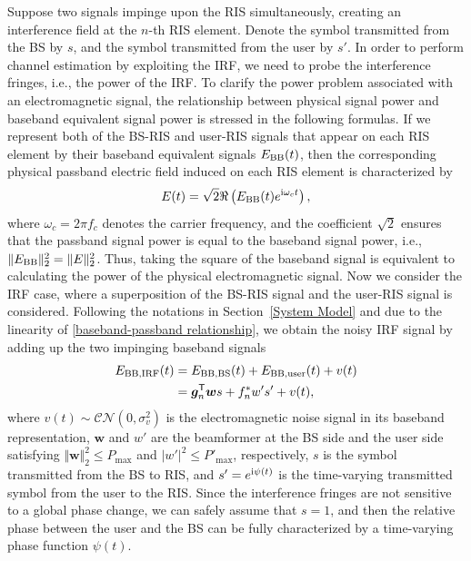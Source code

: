\documentclass[journal,twocolumn]{IEEEtran}
\theoremstyle{nonumberplain}
\def \T {\bm \Theta}
\def \T {^{\mathsf{T}}}
\def \ri {{\rm i}}
\begin{document}
    Suppose two signals impinge upon the RIS simultaneously, creating an interference field at the $n$-th RIS element. Denote the symbol transmitted from the \ac{BS} by $s$, and the symbol transmitted from the user by $s'$. In order to perform channel estimation by exploiting the \ac{IRF}, we need to probe the interference fringes, i.e., the power of the \ac{IRF}. To clarify the power problem associated with an electromagnetic signal, the relationship between physical signal power and baseband equivalent signal power is stressed in the following formulas. 
    If we represent both of the BS-RIS and user-RIS signals that appear on each RIS element by their baseband equivalent signals $E_{{\rm BB}}(t)$, 
    then the corresponding physical passband electric field induced on each RIS element is characterized by 
    \begin{equation}
        E(t) = \sqrt{2} \Re\left( E_{{\rm BB}}(t)e^{\ri\omega_c t} \right),
        \label{baseband-passband relationship}
    \end{equation}
    where $\omega_c = 2\pi f_c$ denotes the carrier frequency, and the coefficient $\sqrt{2}$ ensures that the passband signal power is equal to the baseband signal power, i.e., 
    $\lVert E_{{\rm BB}}\rVert_2^2 = \lVert E\rVert_2^2$. 
    Thus, taking the square of the baseband signal is equivalent to calculating the power of the physical electromagnetic signal. 
    Now we consider the IRF case, where a superposition of the BS-RIS signal and the user-RIS signal is considered. 
    Following the notations in Section~\ref{System Model} and due to the linearity of \eqref{baseband-passband relationship}, we obtain the noisy IRF signal by adding up the two impinging baseband signals
    \begin{equation}
        \begin{aligned}
            E_{{\rm BB, IRF}}(t) &= E_{{\rm BB, BS}}(t)+E_{{\rm BB,user}}(t)+v(t)\\
            &=\bm g_{n}\T\bm w s+f_{n}^{*} w' s' +v(t),
        \end{aligned}
    \end{equation}
    where $v(t)\sim \mathcal{CN}(0,\sigma_{v}^{2})$ is the electromagnetic noise signal in its baseband representation,
    $\bm w$ and $w'$ are the beamformer at the BS side and the user side satisfying $\Vert \bm w \Vert_{2}^{2}\leq P_{\text{max}}$ and $|w'|^{2}\leq P'_{\text{max}}$, respectively,
    $s$ is the symbol transmitted from the BS to RIS, and $s'=e^{\ri \psi(t)}$ is the time-varying transmitted symbol from the user to the RIS.  
    Since the interference fringes are not sensitive to a global phase change, we can safely assume that $s=1$, and then the relative phase between the user and the BS can be fully characterized by a time-varying phase function $\psi(t)$.  
\end{document}
